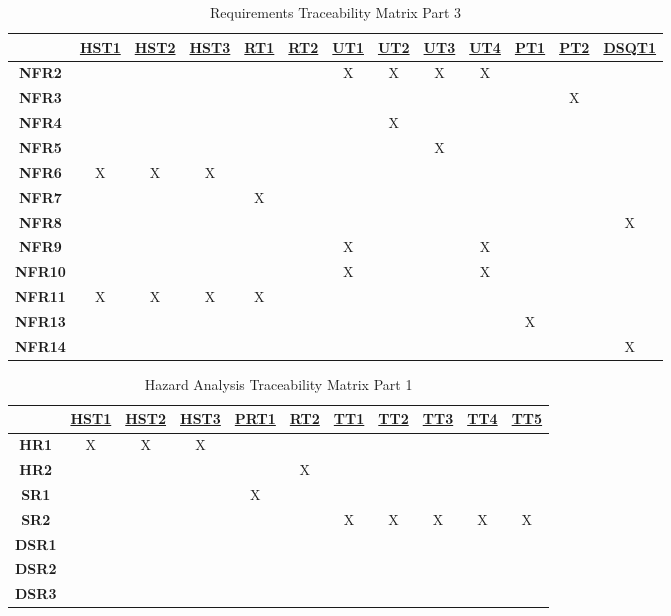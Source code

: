 \documentclass[12pt, titlepage]{article}
\begin{document}
\begin{table}[H]
	\centering
	\begin{tabular}{|c|c|c|c|c|c|c|c|c|c|c|c|c|}
	\hline
	& \hyperref[HST1]{HST1}&\hyperref[HST2]{HST2}& \hyperref[HST3]{HST3}&\hyperref[RT1]{RT1}&\hyperref[RT2]{RT2}&\hyperref[UT1]{UT1}&\hyperref[UT2]{UT2}&\hyperref[UT3]{UT3}&\hyperref[UT4]{UT4}&\hyperref[PT1]{PT1}&\hyperref[PT2]{PT2}&\hyperref[DSQT1]{DSQT1} \\
	\hline       
	\textbf{NFR2}         &&&&&&X&X&X&X&&&\\ \hline
	\textbf{NFR3}         &&&&&&&&&&&X& \\ \hline
	\textbf{NFR4}         &&&&&&&X&&&&&\\ \hline
	\textbf{NFR5}         &&&&&&&&X&&&& \\ \hline
	\textbf{NFR6}         &X&X&X&&&&&&&&&\\ \hline
	\textbf{NFR7}         &&&&X&&&&&&&&\\ \hline
	\textbf{NFR8}         &&&&&&&&&&&&X\\ \hline
	\textbf{NFR9}         &&&&&&X&&&X&&&\\ \hline
	\textbf{NFR10}       &&&&&&X&&&X&&&\\ \hline
	\textbf{NFR11}       &X&X&X&X&&&&&&&&\\ \hline
	\textbf{NFR13}       &&&&&&&&&&X&&\\ \hline
	\textbf{NFR14}       &&&&&&&&&&&&X\\ \hline
	\hline
	\end{tabular}
	\caption{Requirements Traceability Matrix Part 3}
	\label{Table:C_trace}
\end{table}

\begin{table}[H]
	\centering
	\begin{tabular}{|c|c|c|c|c|c|c|c|c|c|c|}
	\hline
	& \hyperref[HST1]{HST1}&\hyperref[HST2]{HST2}& \hyperref[HST3]{HST3} &\hyperref[PRT1]{PRT1}&\hyperref[RT2]{RT2}&\hyperref[TT1]{TT1}&\hyperref[TT2]{TT2}&\hyperref[TT3]{TT3}&\hyperref[TT4]{TT4}&\hyperref[TT5]{TT5} \\
	\hline       
	\textbf{HR1}         &X&X&X&&&&&&& \\ \hline
	\textbf{HR2}         &&&&&X&&&&& \\ \hline
	\textbf{SR1}         &&&&X&&&&&& \\ \hline
	\textbf{SR2}         &&&&&&X&X&X&X&X \\ \hline
	\textbf{DSR1}       &&&&&&&&&& \\ \hline
	\textbf{DSR2}       &&&&&&&&&& \\ \hline
	\textbf{DSR3}       &&&&&&&&&& \\ \hline
	\hline
	\end{tabular}
	\caption{Hazard Analysis Traceability Matrix Part 1}
	\label{Table:C_trace}
\end{table}
\end{document}
